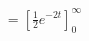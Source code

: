 \documentclass[preview]{standalone}
\begin{document}
\begin{align*}
= [\frac{1}{2}e^{-2t}]^{\infty}_{0}
\end{align*}
\end{document}
